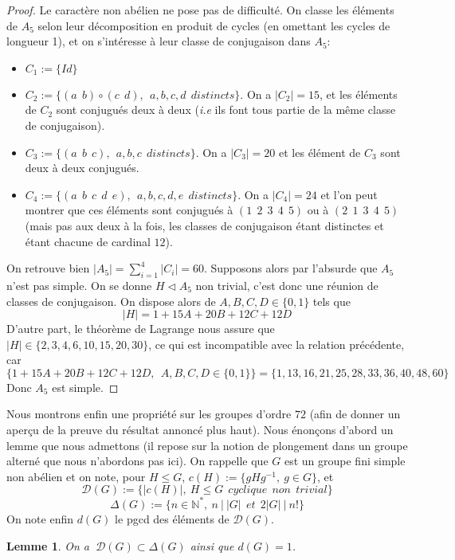\documentclass[10pt,a4paper]{article}
\newtheorem{lemma}{Lemme}
\begin{document}
\begin{proof}
Le caractère non abélien ne pose pas de difficulté. On classe les éléments de $A_5$ selon leur décomposition en produit de cycles (en omettant les cycles de longueur 1), et on s'intéresse à leur classe de conjugaison dans $A_5$:
\begin{itemize}
\item $C_1:=\{Id\}$
\item $C_2:=\{(a \:\:b) \circ (c \:\: d), \:\: a,b,c,d \:\:distincts \}$. On a $|C_2|= 15$, et les éléments de $C_2$ sont conjugués deux à deux (\textit{i.e} ils font tous partie de la même classe de conjugaison).
\item $C_3:= \{(a \:\: b \:\: c),\:\: a,b,c \:\: distincts\}$. On a $|C_3|= 20$ et les élément de $C_3$ sont deux à deux conjugués.
\item $C_4 := \{(a \:\: b \:\: c \:\: d \:\: e), \:\: a,b,c,d,e \:\: distincts\}$. On a $|C_4|= 24$ et l'on peut montrer que ces éléments sont conjugués à $(1\:\:2\:\:3\:\:4\:\:5)$ ou à $(2\:\:1\:\:3\:\:4\:\:5)$ (mais pas aux deux à la fois, les classes de conjugaison étant distinctes et étant chacune de cardinal $12$).
\end{itemize}
On retrouve bien $|A_5|= \sum_{i=1}^{4}|C_i|=60$. Supposons alors par l'absurde que $A_5$ n'est pas simple. On se donne $ H \triangleleft A_5$ non trivial, c'est donc une réunion de classes de conjugaison. On dispose alors de $A,B,C,D \in \{0,1\}$ tels que 
$$|H| = 1 + 15A + 20B + 12C + 12D$$
D'autre part, le théorème de Lagrange nous assure que $|H| \in \{2,3,4,6,10,15,20,30\}$, ce qui est incompatible avec la relation précédente, car 
$$\{1 + 15A + 20B + 12C + 12D, \:\: A,B,C,D \in \{0,1\}\}=\{1,13,16,21,25,28,33,36,40,48,60\}$$ 
Donc $A_5$ est simple.
\end{proof}

Nous montrons enfin une propriété sur les groupes d'ordre $72$ (afin de donner un aperçu de la preuve du résultat annoncé plus haut). Nous énonçons d'abord un lemme que nous admettons (il repose sur la notion de plongement dans un groupe alterné que nous n'abordons pas ici). On rappelle que $G$ est un groupe fini simple non abélien et on note, pour $H \leq G$, $c(H):=\{gHg^{-1}, \: g \in G\}$, et 
$$ \mathcal{D}(G):=\{|c(H)|, \: H \leq G \:\: cyclique\:\: non \:\: trivial\}$$ 
$$ \Delta(G):=\{n \in \mathbb{N}^*, \: n\:|\:|G| \:\: et \:\: 2|G| \:|\: n!\}$$
On note enfin $d(G)$ le pgcd des éléments de $\mathcal{D}(G)$.
\begin{lemma}
On a $\:\mathcal{D}(G) \subset \Delta(G)$ ainsi que $d(G) = 1$.
\end{lemma}
\end{document}
